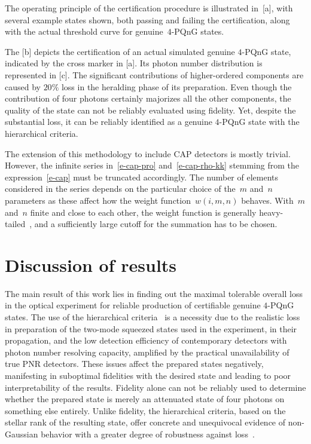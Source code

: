 \documentclass{article}
\begin{document}
The operating principle of the certification procedure is illustrated in~[a], with several example states shown, both passing and failing the certification, along with the actual threshold curve for genuine~$4$-PQnG states.  

The [b] depicts the certification of an actual simulated genuine $4$-PQnG state, indicated by the cross marker in [a]. Its photon number distribution is represented in [c]. The significant contributions of higher-ordered components are caused by $20\%$ loss in the heralding phase of its preparation. Even though the contribution of four photons certainly majorizes all the other components, the quality of the state can not be reliably evaluated using fidelity. Yet, despite the substantial loss, it can be reliably identified as a genuine $4$-PQnG state with the hierarchical criteria. 

The extension of this methodology to include CAP detectors is mostly trivial. However, the infinite series in~\eqref{e-cap-pro} and~\eqref{e-cap-rho-kk} stemming from the expression~\eqref{e-cap} must be truncated accordingly. The number of elements considered in the series depends on the particular choice of the~$m$ and~$n$ parameters as these affect how the weight function~${w(i, m, n)}$ behaves. With~$m$ and~$n$ finite and close to each other, the weight function is generally heavy-tailed~\cite{provaznik2020}, and a sufficiently large cutoff for the summation has to be chosen.

%

\FloatBarrier
\section{Discussion of results}

The main result of this work lies in finding out the maximal tolerable overall loss in the optical experiment for reliable production of certifiable genuine $4$-PQnG states. The use of the hierarchical criteria~\cite{lachman2019} is a necessity due to the realistic loss in preparation of the two-mode squeezed states used in the experiment, in their propagation, and the low detection efficiency of contemporary detectors with photon number resolving capacity, amplified by the practical unavailability of true PNR detectors. These issues affect the prepared states negatively, manifesting in suboptimal fidelities with the desired state and leading to poor interpretability of the results. Fidelity alone can not be reliably used to determine whether the prepared state is merely an attenuated state of four photons on something else entirely. Unlike fidelity, the hierarchical criteria, based on the stellar rank of the resulting state, offer concrete and unequivocal evidence of non-Gaussian behavior with a greater degree of robustness against loss~\cite{lachman2019}.
\end{document}
